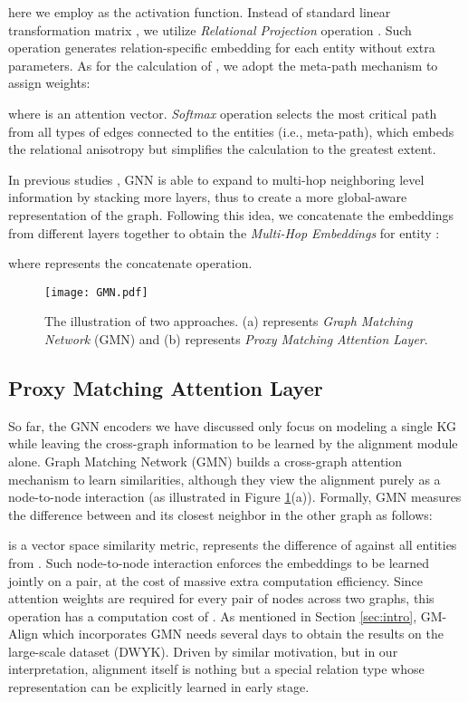 \documentclass[sigconf]{acmart}
\begin{document}
here we employ  as the activation function.
Instead of standard linear transformation matrix , we utilize \emph{Relational Projection} operation \cite{DBLP:conf/cikm/MaoWXWL20}.
Such operation generates relation-specific embedding for each entity without extra parameters.
As for the calculation of , we adopt the meta-path \cite{DBLP:conf/nips/YunJKKK19} mechanism to assign weights:

where  is an attention vector.
\emph{Softmax} operation selects the most critical path from all types of edges connected to the entities (i.e., meta-path), which embeds the relational anisotropy but simplifies the calculation to the greatest extent.

In previous studies \cite{DBLP:conf/aaai/SunW0CDZQ20,DBLP:conf/wsdm/MaoWXLW20}, GNN is able to expand to multi-hop neighboring level information by stacking more layers, thus to create a more global-aware representation of the graph.
Following this idea, we concatenate the embeddings from different layers together to obtain the \emph{Multi-Hop Embeddings} for entity :

where  represents the concatenate operation.

\begin{figure}[t]
  \centering
  \texttt{[image: GMN.pdf]}
  \caption{The illustration of two approaches. (a) represents \emph{Graph Matching Network} (GMN) and (b) represents \emph{Proxy Matching Attention Layer}.}\label{Figure:GMN}
\end{figure}

\subsection{Proxy Matching Attention Layer}
So far, the GNN encoders we have discussed only focus on modeling a single KG while leaving the cross-graph information to be learned by the alignment module alone.
Graph Matching Network \cite{DBLP:conf/icml/LiGDVK19} (GMN) builds a cross-graph attention mechanism to learn similarities, although they view the alignment purely as a node-to-node interaction (as illustrated in Figure \ref{Figure:GMN}(a)).
Formally, GMN measures the difference between  and its closest neighbor in the other graph as follows:




 is a vector space similarity metric,  represents the difference of  against all entities from .
Such node-to-node interaction enforces the embeddings to be learned jointly on a pair, at the cost of massive extra computation efficiency.
Since attention weights are required for every pair of nodes across two graphs, this operation has a computation cost of .
As mentioned in Section \ref{sec:intro}, GM-Align which incorporates GMN needs several days to obtain the results on the large-scale dataset (DWYK).
Driven by similar motivation, but in our interpretation, alignment itself is nothing but a special relation type whose representation can be explicitly learned in early stage.
\end{document}
